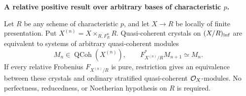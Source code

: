 \par\smallskip\noindent\textbf{A relative positive result over arbitrary bases of characteristic $p$.}

\begin{proposition}\label{prop:DE-E2-relative-Frobenius}
Let $R$ be any scheme of characteristic $p$, and let $X\to R$ be locally of finite presentation.  Put $X^{(n)}=X\times_{R,F_R^n}R$.  Quasi-coherent crystals on $(X/R)_{\rm inf}$ are equivalent to systems of arbitrary quasi-coherent modules
\[
 M_n\in\operatorname{QCoh}(X^{(n)}),\qquad
 F_{X^{(n)}/R}^*M_{n+1}\simeq M_n.
\]
If every relative Frobenius $F_{X^{(n)}/R}$ is pure, restriction gives an equivalence between these crystals and ordinary stratified quasi-coherent $\mathcal O_X$-modules.  No perfectness, reducedness, or Noetherian hypothesis on $R$ is required.
\end{proposition}

